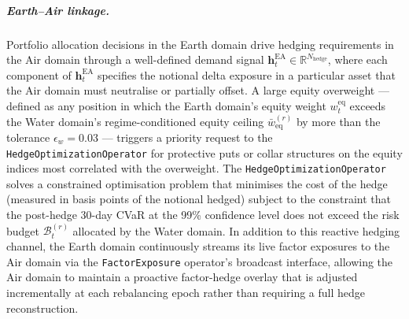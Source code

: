 \documentclass[12pt,openany]{book}
\numberwithin{equation}{chapter}
\theoremstyle{plain}
\theoremstyle{definition}
\theoremstyle{remark}
\begin{document}
\subparagraph{Earth--Air linkage.}
Portfolio allocation decisions in the Earth domain drive hedging requirements in the Air domain through a well-defined demand signal $\mathbf{h}_t^{\mathrm{EA}} \in \mathbb{R}^{N_{\mathrm{hedge}}}$, where each component of $\mathbf{h}_t^{\mathrm{EA}}$ specifies the notional delta exposure in a particular asset that the Air domain must neutralise or partially offset. A large equity overweight — defined as any position in which the Earth domain's equity weight $w_t^{\mathrm{eq}}$ exceeds the Water domain's regime-conditioned equity ceiling $\bar{w}^{(r)}_{\mathrm{eq}}$ by more than the tolerance $\epsilon_w = 0.03$ — triggers a priority request to the \texttt{HedgeOptimizationOperator} for protective puts or collar structures on the equity indices most correlated with the overweight. The \texttt{HedgeOptimizationOperator} solves a constrained optimisation problem that minimises the cost of the hedge (measured in basis points of the notional hedged) subject to the constraint that the post-hedge 30-day CVaR at the 99\% confidence level does not exceed the risk budget $\mathcal{B}^{(r)}_t$ allocated by the Water domain. In addition to this reactive hedging channel, the Earth domain continuously streams its live factor exposures to the Air domain via the \texttt{FactorExposure} operator's broadcast interface, allowing the Air domain to maintain a proactive factor-hedge overlay that is adjusted incrementally at each rebalancing epoch rather than requiring a full hedge reconstruction.
\end{document}
